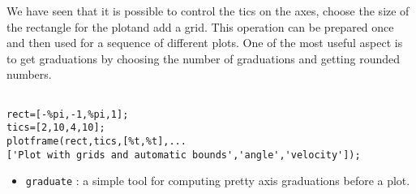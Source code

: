 We have seen that it is possible to control the tics on the axes,
choose the size of the rectangle for the plotand add a grid.
This operation can be prepared once and then used for a sequence of
different plots. One of the most useful aspect is to get  graduations 
by choosing the number of graduations and getting rounded numbers.

\begin{verbatim}

rect=[-%pi,-1,%pi,1];
tics=[2,10,4,10];
plotframe(rect,tics,[%t,%t],...
['Plot with grids and automatic bounds','angle','velocity']);

\end{verbatim}

\begin{itemize}
	\item \verb+graduate+	: a simple tool for computing pretty
axis graduations before a plot.
\end{itemize}
%

